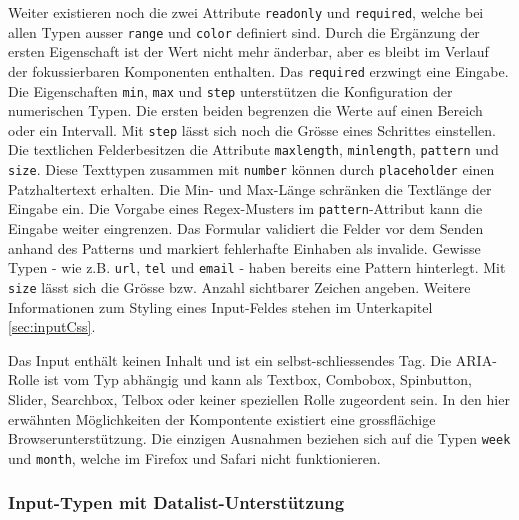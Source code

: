 Weiter existieren noch die zwei Attribute \texttt{readonly} und \texttt{required}, welche bei allen Typen ausser \texttt{range} und \texttt{color} definiert sind.
Durch die Ergänzung der ersten Eigenschaft ist der Wert nicht mehr änderbar, aber es bleibt im Verlauf der fokussierbaren Komponenten enthalten.
Das \texttt{required} erzwingt eine Eingabe.
Die Eigenschaften \texttt{min}, \texttt{max} und \texttt{step} unterstützen die Konfiguration der numerischen Typen\footnotemark.
Die ersten beiden begrenzen die Werte auf einen Bereich oder ein Intervall.
Mit \texttt{step} lässt sich noch die Grösse eines Schrittes einstellen.
Die textlichen Felder\footnotemark besitzen die Attribute \texttt{maxlength}, \texttt{minlength}, \texttt{pattern} und \texttt{size}.
Diese Texttypen zusammen mit \texttt{number} können durch \texttt{placeholder} einen Patzhaltertext erhalten.
Die Min- und Max-Länge schränken die Textlänge der Eingabe ein.
Die Vorgabe eines Regex-Musters im \texttt{pattern}-Attribut kann die Eingabe weiter eingrenzen.
Das Formular validiert die Felder vor dem Senden anhand des Patterns und markiert fehlerhafte Einhaben als invalide.
Gewisse Typen - wie z.B. \texttt{url}, \texttt{tel} und \texttt{email} - haben bereits eine Pattern hinterlegt.
Mit \texttt{size} lässt sich die Grösse bzw. Anzahl sichtbarer Zeichen angeben.
Weitere Informationen zum Styling eines Input-Feldes stehen im Unterkapitel \ref{sec:inputCss}.

Das Input enthält keinen Inhalt und ist ein selbst-schliessendes Tag.
Die ARIA-Rolle ist vom Typ abhängig und kann als Textbox, Combobox, Spinbutton, Slider, Searchbox, Telbox oder keiner speziellen Rolle zugeordent sein.
In den hier erwähnten Möglichkeiten der Kompontente existiert eine grossflächige Browserunterstützung.
Die einzigen Ausnahmen beziehen sich auf die Typen \texttt{week} und \texttt{month}, welche im Firefox und Safari nicht funktionieren.


\subsubsection{{\color{dgray} Input-Typen mit Datalist-Unterstützung}}
\label{sec:inutTypesDatalist}

